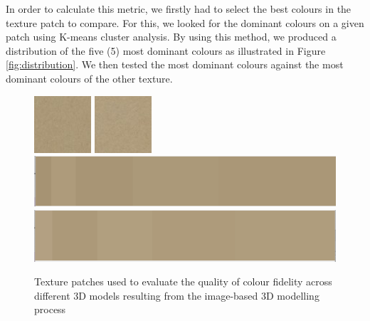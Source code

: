 \documentclass[acmlarge,screen,dvipsnames]{acmart}
\begin{document}
In order to calculate this metric, we firstly had to select the best
colours in the texture patch to compare. For this, we looked for the
dominant colours on a given patch using K-means cluster analysis. By
using this method, we produced a distribution of the five (5) most dominant
colours as illustrated in Figure \ref{fig:distribution}. We then tested
the most dominant colours against the most dominant colours of the other
texture.


\begin{figure}[ht] \centering
{}
  {\includegraphics[width=0.45\linewidth]{images/m1tex_80x80.png}
   \includegraphics[width=0.45\linewidth]{images/m2tex_80x80.png}
  }\\[-0.5\baselineskip]
  {\includegraphics[width=0.45\linewidth]{images/domtex1.png}
   \includegraphics[width=0.45\linewidth]{images/domtex2.png}
  }\\[-0.5\baselineskip]

 \caption{Texture patches used to evaluate the quality of colour fidelity across different 3D models resulting from the image-based 3D modelling process} 
 \label{fig:texturepatches} 
\end{figure} 
\end{document}
